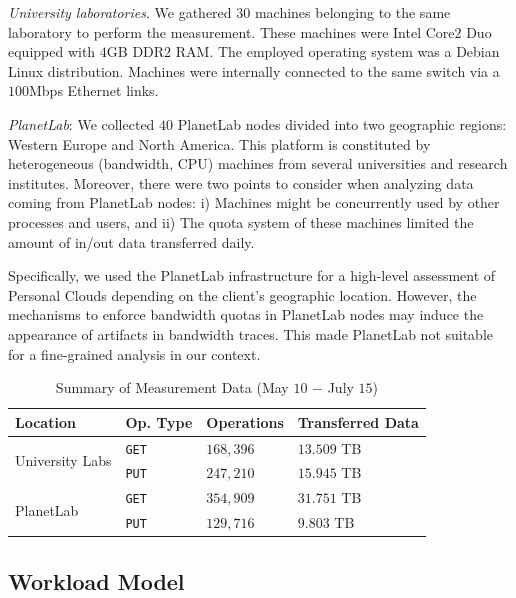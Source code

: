 \textit{University laboratories}. We gathered $30$ machines
belonging to the same laboratory to perform the measurement.
These machines were Intel Core$2$ Duo equipped with $4$GB DDR$2$ RAM. 
The employed operating system was a Debian Linux distribution. 
Machines were internally connected to the same switch via a $100$Mbps Ethernet links.

\textit{PlanetLab}: We collected $40$ PlanetLab nodes divided into
two geographic regions: Western Europe and North America. 
This platform is constituted by heterogeneous (bandwidth, CPU) machines from several
universities and research institutes. Moreover, there were two points to consider
when analyzing data coming from PlanetLab nodes: i) Machines might be concurrently
used by other processes and users, and ii) The quota system of these machines
limited the amount of in/out data transferred daily. 

Specifically, we used the PlanetLab infrastructure for
a high-level assessment of Personal Clouds depending on the 
client's geographic location. 
However, the mechanisms to enforce bandwidth quotas
in PlanetLab nodes may induce the appearance of artifacts 
in bandwidth traces. This made PlanetLab not 
suitable for a fine-grained analysis in our context.
   
\begin{table}%
\begin{center}

\begin{tabular}{|l|l|l|l|}
\hline
Location & Op. Type & Operations & Transferred Data \\ \hline
\multirow{2}{*}{University Labs}
 & \texttt{GET} & $168,396$ & $13.509$ TB\\
 & \texttt{PUT} & $247,210$ & $15.945$ TB\\ \hline
\multirow{2}{*}{PlanetLab}
 & \texttt{GET} & $354,909$ & $31.751$ TB\\
 & \texttt{PUT} & $129,716$ & $9.803$ TB\\ \hline
\end{tabular}
\caption{Summary of Measurement Data (May $10$ $-$ July $15$)}
\vspace{-9mm}
\label{tab:measurement_data}
\end{center}
\end{table}

\subsection{Workload Model} 

